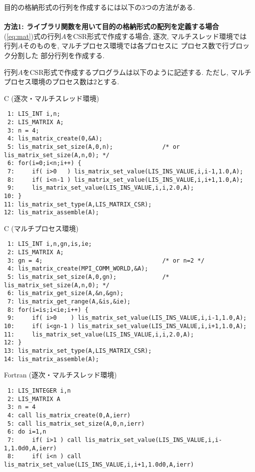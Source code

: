 \documentclass[a4paper]{jarticle}
\begin{document}
{{目的の格納形式の行列を作成するには以下の3つの方法がある.\\ \\
\noindent
{\bf 方法1: ライブラリ関数を用いて目的の格納形式の配列を定義する場合}\\
(\ref{eq:mat})式の行列$A$をCSR形式で作成する場合, 
逐次, マルチスレッド環境では行列$A$そのものを, マルチプロセス環境では各プロセスに
プロセス数で行ブロック分割した
部分行列を作成する. 

行列$A$をCSR形式で作成するプログラムは以下のように記述する. 
ただし, マルチプロセス環境のプロセス数は$2$とする. 
\begin{itembox}[l]{C (逐次・マルチスレッド環境)}
\small
\begin{verbatim}
 1: LIS_INT i,n;
 2: LIS_MATRIX A;
 3: n = 4;
 4: lis_matrix_create(0,&A);
 5: lis_matrix_set_size(A,0,n);              /* or lis_matrix_set_size(A,n,0); */ 
 6: for(i=0;i<n;i++) {
 7:     if( i>0   ) lis_matrix_set_value(LIS_INS_VALUE,i,i-1,1.0,A);
 8:     if( i<n-1 ) lis_matrix_set_value(LIS_INS_VALUE,i,i+1,1.0,A);
 9:     lis_matrix_set_value(LIS_INS_VALUE,i,i,2.0,A);
10: }
11: lis_matrix_set_type(A,LIS_MATRIX_CSR);
12: lis_matrix_assemble(A);
\end{verbatim}
\end{itembox}
\begin{itembox}[l]{C (マルチプロセス環境)}
\small
\begin{verbatim}
 1: LIS_INT i,n,gn,is,ie;                 
 2: LIS_MATRIX A;
 3: gn = 4;                                  /* or n=2 */
 4: lis_matrix_create(MPI_COMM_WORLD,&A);
 5: lis_matrix_set_size(A,0,gn);             /*	lis_matrix_set_size(A,n,0); */
 6: lis_matrix_get_size(A,&n,&gn);
 7: lis_matrix_get_range(A,&is,&ie);
 8: for(i=is;i<ie;i++) {
 9:     if( i>0    ) lis_matrix_set_value(LIS_INS_VALUE,i,i-1,1.0,A);
10:     if( i<gn-1 ) lis_matrix_set_value(LIS_INS_VALUE,i,i+1,1.0,A);
11:     lis_matrix_set_value(LIS_INS_VALUE,i,i,2.0,A);
12: }
13: lis_matrix_set_type(A,LIS_MATRIX_CSR);
14: lis_matrix_assemble(A);
\end{verbatim}
\end{itembox}
\begin{itembox}[l]{Fortran (逐次・マルチスレッド環境)}
\small
\begin{verbatim}
 1: LIS_INTEGER i,n
 2: LIS_MATRIX A
 3: n = 4
 4: call lis_matrix_create(0,A,ierr)
 5: call lis_matrix_set_size(A,0,n,ierr)
 6: do i=1,n
 7:     if( i>1 ) call lis_matrix_set_value(LIS_INS_VALUE,i,i-1,1.0d0,A,ierr)
 8:     if( i<n ) call lis_matrix_set_value(LIS_INS_VALUE,i,i+1,1.0d0,A,ierr)

\end{verbatim}
\end{itembox}}}
\end{document}
